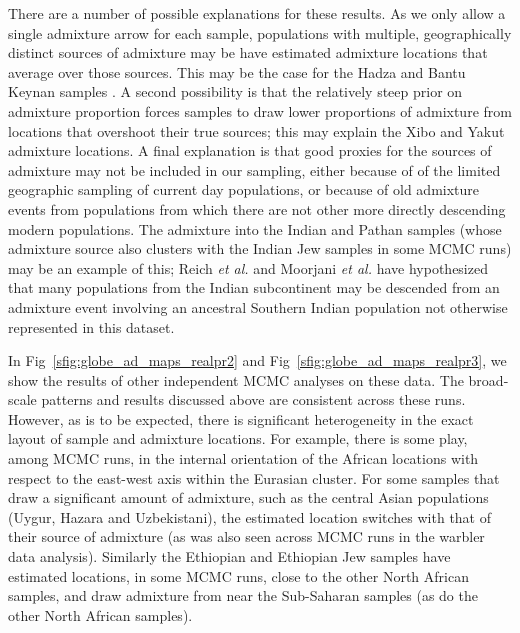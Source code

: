 \documentclass[10pt,letterpaper]{article}
\begin{document}
There are a number of possible explanations for these results. As we only allow a single admixture arrow for each sample, populations with multiple, geographically distinct sources of admixture may be have estimated admixture locations that average over those sources. This may be the case for the Hadza and Bantu Keynan samples \cite{Hellenthal}.  A second possibility is that the relatively steep prior on admixture proportion forces samples to draw lower proportions of admixture from locations that overshoot their true sources; this may explain the Xibo and Yakut admixture locations. A final explanation is that good proxies for the sources of admixture may not be included in our sampling, either because of of the limited geographic sampling of current day populations, or because of old admixture events from populations from which there are not other more directly descending modern populations. The admixture into the Indian and Pathan samples (whose admixture source also clusters with the Indian Jew samples in some MCMC runs) may be an example of this; Reich \emph{et al.} \cite{reich_india_2009} and Moorjani \emph{et al.} \cite{moorjani_india_2013} have hypothesized that many populations from the Indian subcontinent may be descended from an admixture event involving an ancestral Southern Indian population not otherwise represented in this dataset.

In Fig\ \ref{sfig:globe_ad_maps_realpr2} and Fig\ \ref{sfig:globe_ad_maps_realpr3}, we show the results of other independent MCMC analyses on these data. The broad-scale patterns and results discussed above are consistent across these runs. However, as is to be expected, there is significant heterogeneity in the exact layout of sample and admixture locations. For example, there is some play, among MCMC runs, in the internal orientation of the African locations with respect to the east-west axis within the Eurasian cluster.  For some samples that draw a significant amount of admixture, such as the central Asian populations (Uygur, Hazara and Uzbekistani), the estimated location switches with that of their source of admixture (as was also seen across MCMC runs in the warbler data analysis). Similarly the Ethiopian and Ethiopian Jew samples have estimated locations, in some MCMC runs, close to the other North African samples, and draw admixture from near the Sub-Saharan samples (as do the other North African samples).
\end{document}
